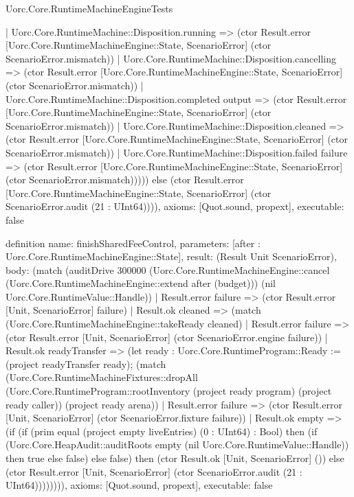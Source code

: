 \begin{lexlean}{Uorc.Core.RuntimeMachineEngineTests}
\begin{semanticmodule}
{    | Uorc.Core.RuntimeMachine::Disposition.running => (ctor Result.error [Uorc.Core.RuntimeMachineEngine::State, ScenarioError] (ctor ScenarioError.mismatch))
    | Uorc.Core.RuntimeMachine::Disposition.cancelling => (ctor Result.error [Uorc.Core.RuntimeMachineEngine::State, ScenarioError] (ctor ScenarioError.mismatch))
    | Uorc.Core.RuntimeMachine::Disposition.completed output => (ctor Result.error [Uorc.Core.RuntimeMachineEngine::State, ScenarioError] (ctor ScenarioError.mismatch))
    | Uorc.Core.RuntimeMachine::Disposition.cleaned => (ctor Result.error [Uorc.Core.RuntimeMachineEngine::State, ScenarioError] (ctor ScenarioError.mismatch))
    | Uorc.Core.RuntimeMachine::Disposition.failed failure => (ctor Result.error [Uorc.Core.RuntimeMachineEngine::State, ScenarioError] (ctor ScenarioError.mismatch))))) else (ctor Result.error [Uorc.Core.RuntimeMachineEngine::State, ScenarioError] (ctor ScenarioError.audit (21 : UInt64)))),
  axioms: [Quot.sound, propext],
  executable: false
}

definition{
  name: finishSharedFeeControl,
  parameters: [after : Uorc.Core.RuntimeMachineEngine::State],
  result: (Result Unit ScenarioError),
  body: (match (auditDrive 300000 (Uorc.Core.RuntimeMachineEngine::cancel (Uorc.Core.RuntimeMachineEngine::extend after (budget))) (nil Uorc.Core.RuntimeValue::Handle))
    | Result.error failure => (ctor Result.error [Unit, ScenarioError] failure)
    | Result.ok cleaned => (match (Uorc.Core.RuntimeMachineEngine::takeReady cleaned)
      | Result.error failure => (ctor Result.error [Unit, ScenarioError] (ctor ScenarioError.engine failure))
      | Result.ok readyTransfer => (let ready : Uorc.Core.RuntimeProgram::Ready := (project readyTransfer ready); (match (Uorc.Core.RuntimeMachineFixtures::dropAll (Uorc.Core.RuntimeProgram::rootInventory (project ready program) (project ready caller)) (project ready arena))
        | Result.error failure => (ctor Result.error [Unit, ScenarioError] (ctor ScenarioError.fixture failure))
        | Result.ok empty => (if (if (prim equal (project empty liveEntries) (0 : UInt64) : Bool) then (if (Uorc.Core.HeapAudit::auditRoots empty (nil Uorc.Core.RuntimeValue::Handle)) then true else false) else false) then (ctor Result.ok [Unit, ScenarioError] ()) else (ctor Result.error [Unit, ScenarioError] (ctor ScenarioError.audit (21 : UInt64)))))))),
  axioms: [Quot.sound, propext],
  executable: false
}


\end{semanticmodule}
\end{lexlean}

